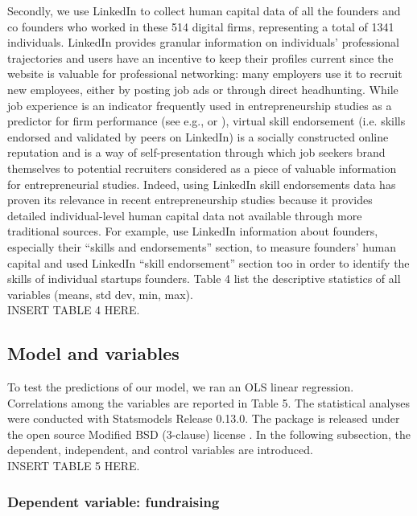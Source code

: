 \documentclass[12pt]{article}
\begin{document}
Secondly, we use LinkedIn to collect human capital data of all the founders and co founders who worked in these 514 digital firms, representing a total of 1341 individuals. LinkedIn provides granular information on individuals’ professional trajectories and users have an incentive to keep their profiles current since the website is valuable for professional networking: many employers use it to recruit new employees, either by posting job ads or through direct headhunting. While job experience is an indicator frequently used in entrepreneurship studies as a predictor for firm performance (see e.g., \citet{colombo2005founders} or \citet{delmar2006does}), virtual skill endorsement (i.e. skills endorsed and validated by peers on LinkedIn) is a socially constructed online reputation and is a way of self-presentation through which job seekers brand themselves to potential recruiters \citep{rapanta2017linkedin} considered as a piece of valuable information for entrepreneurial studies. Indeed, using LinkedIn skill endorsements data has proven its relevance in recent entrepreneurship studies because it provides detailed individual-level human capital data not available through more traditional sources. For example, \citet{reese2020should} use LinkedIn information about founders, especially their “skills and endorsements” section, to measure founders’ human capital and \citet{sako2020scaling} used LinkedIn “skill endorsement” section too in order to identify the skills of individual startups founders. Table 4 list the descriptive statistics of all variables (means, std dev, min, max). \\

INSERT TABLE 4 HERE.

\subsection{Model and variables}

To test the predictions of our model, we ran an OLS linear regression. Correlations among the variables are reported in Table 5\label{table5}. The statistical analyses were conducted with Statsmodels Release 0.13.0. The package is released under the open source Modified BSD (3-clause) license \citep{seabold2010statsmodels}. In the following subsection, the dependent, independent, and control variables are introduced. \\

INSERT TABLE 5 HERE.

\subsubsection{Dependent variable: fundraising}
\end{document}
